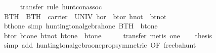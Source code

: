 \begin{isabellebody}
\ \ \ \ \isamarkupfalse%
\ {}transfer{}\ rule\ hunt{}con{}assoc{}\isanewline
{}\isamarkupfalse%
%
\endisatagproof
{\isafoldproof}%
%
\isadelimproof
\isanewline
%
\endisadelimproof
\isanewline
{}\isamarkupfalse%
\ BTH\ \ {}BTH\ {}\ {}carrier\ {}\ UNIV{}\ hor\ {}\ bt{}or{}\ hnot\ {}\ bt{}not{}{}\isanewline
\isanewline
{}\isamarkupfalse%
\ bt{}hone\ {}simp{}{}\ {}huntington{}algebra{}hone\ BTH\ {}\ bt{}one{}\isanewline
%
\isadelimproof
%
\endisadelimproof
%
\isatagproof
{}\isamarkupfalse%
\ {}\isanewline
\ \ \isamarkupfalse%
\ {}bt{}or\ bt{}one\ {}bt{}not\ bt{}one{}\ {}\ bt{}one{}\isanewline
\ \ \ \ \isamarkupfalse%
\ {}transfer{}\ metis\ one{}\isanewline
\ \ \isamarkupfalse%
\ {}thesis\isanewline
\ \ \ \ \isamarkupfalse%
\ {}simp\ add{}\ huntington{}algebra{}one{}prop{}symmetric{}\ OF\ free{}ba{}hunt{}{}\isanewline

\end{isabellebody}

